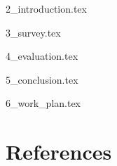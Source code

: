 \documentclass{article}
\newcommand\blankpage{%
    \null
    \thispagestyle{empty}
    \addtocounter{page}{-1}
    \newpage}
\begin{document}

    \maketitle





    \tableofcontents
    \restoregeometry

    \newpage

     {
      \fancyhf{}
      \lhead[\rightmark]{\thepage}
      \rhead[\thepage]{\leftmark}
      \setlength{\parindent}{0pt}
      \setlength{\parskip}{2ex}
    }


    {2_introduction.tex}

    {3_survey.tex}

    {4_evaluation.tex}

    {5_conclusion.tex}

    {6_work_plan.tex}

    \cleardoublepage
    
    \renewcommand*{\refname}{}
    \section{References}
    


\end{document}
